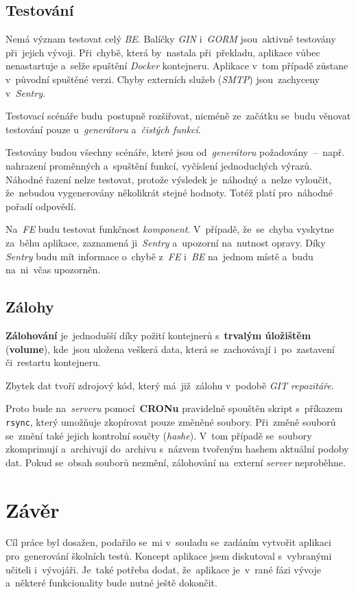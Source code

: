 \documentclass[11pt,a4paper]{report}
\let\oldacrshort\acrshort
\renewcommand{\acrshort}[1]{\emph{\normalsize\color[rgb]{0,0,0}\noindent\oldacrshort{#1}}}
\begin{document}
        \section{Testování}
            Nemá význam testovat celý \acrshort{BE}. Balíčky \emph{GIN} i~\emph{GORM} jsou~aktivně testovány při~jejich vývoji. Při~chybě, která by~nastala při~překladu, aplikace vůbec nenastartuje a~selže spuštění \emph{Docker} kontejneru. Aplikace v~tom případě zůstane v~původní spuštěné verzi. Chyby externích služeb (\emph{SMTP}) jsou~zachyceny v~\emph{Sentry}.
            
            Testovací scénáře budu~postupně rozšiřovat, nicméně ze~začátku se~budu věnovat testování pouze u~\emph{generátoru} a~\emph{čistých funkcí}.

            Testovány budou všechny scénáře, které jsou od~\emph{generátoru} požadovány~--~např. nahrazení proměnných a~spuštění funkcí, vyčíslení jednoduchých výrazů. Náhodné řazení nelze testovat, protože výsledek je~náhodný a~nelze vyloučit, že~nebudou vygenerovány několikrát stejné hodnoty. Totéž platí pro~náhodné pořadí odpovědí.

            Na~\acrshort{FE} budu testovat funkčnost \emph{komponent}. V~případě, že~se~chyba vyskytne za~běhu aplikace, zaznamená ji~\emph{Sentry} a~upozorní na~nutnost opravy. Díky \emph{Sentry} budu mít informace o~chybě z~\acrshort{FE} i~\acrshort{BE} na~jednom místě a~budu na~ni~včas upozorněn.

        \section{Zálohy}
            \textbf{Zálohování} je~jednodušší díky požití kontejnerů s~\textbf{trvalým úložištěm} (\textbf{volume}), kde~jsou uložena veškerá data, která se~zachovávají i~po~zastavení či~restartu kontejneru.
            
            Zbytek dat tvoří zdrojový kód, který má~již~zálohu v~podobě \emph{GIT repozitáře}.

            Proto bude na~\emph{serveru} pomocí~\textbf{CRONu} pravidelně spouštěn skript s~příkazem \texttt{rsync}, který umožňuje zkopírovat pouze změněné soubory. Při~změně souborů se~změní také jejich kontrolní součty (\emph{hashe}). V~tom případě se~soubory zkomprimují a~archivují do~archivu s~názvem tvořeným hashem aktuální podoby dat. Pokud se~obsah souborů nezmění, zálohování na~externí \emph{server} neproběhne.
            
    \chapter{Závěr}
        Cíl práce byl dosažen, podařilo se~mi v~souladu se~zadáním vytvořit aplikaci pro~generování školních testů. Koncept aplikace jsem diskutoval s~vybranými učiteli i~vývojáři. Je~také potřeba dodat, že~aplikace je~v~rané fázi vývoje a~některé funkcionality bude nutné ještě dokončit.
        
\end{document}
